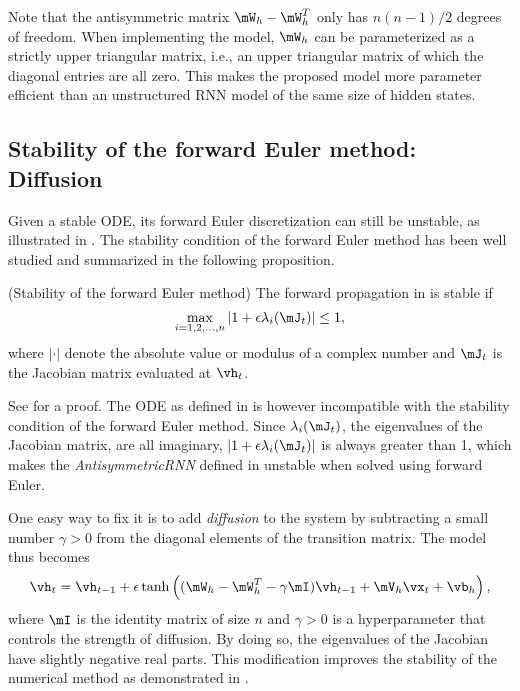 Note that the antisymmetric matrix $\mW_h - \mW_h^T$ only has $n(n-1)/2$ degrees of freedom.
When implementing the model, 
$\mW_h$ can be parameterized as a strictly upper triangular matrix, 
i.e., an upper triangular matrix of which the diagonal entries are all zero.
This makes the proposed model more parameter efficient than an unstructured RNN model of the same size of hidden states.


\subsection{Stability of the forward Euler method: Diffusion}

Given a stable ODE, its forward Euler discretization can still be unstable, as illustrated in .
The stability condition of the forward Euler method has been well studied and summarized in the following proposition.
\begin{proposition}
\label{prop:forward_Euler_stability}
(Stability of the forward Euler method) 
The forward propagation in  is stable if
\begin{equation}
    \max_{i=1, 2, \ldots, n}
    |1 + \epsilon \lambda_i (\mJ_{t})| \leq 1,
\end{equation}
where $|\cdot|$ denote the absolute value or modulus of a complex number and $\mJ_{t}$ is the Jacobian matrix evaluated at $\vh_t$.
\end{proposition}
See \cite{ascher1998computer} for a proof.
The ODE as defined in  is however incompatible with the stability condition of the forward Euler method.
Since $\lambda_i (\mJ_{t})$, the eigenvalues of the Jacobian matrix, are all imaginary, $|1 + \epsilon \lambda_i (\mJ_{t})|$ is always greater than 1, which makes the \textit{AntisymmetricRNN} defined in  unstable when solved using forward Euler.


One easy way to fix it is to add \textit{diffusion} to the system by subtracting a small number $\gamma > 0$ from the diagonal elements of the transition matrix.
The model thus becomes
\begin{equation}
\label{eq:antisymm_RNN_diff}
\vh_{t}
=
\vh_{t-1}
+
\epsilon
\tanh\left((\mW_h - \mW_h^T - \gamma \mI) \vh_{t-1} + \mV_h \vx_{t} + \vb_h
\right),
\end{equation}
where $\mI$ is the identity matrix of size $n$ and $\gamma > 0$ is a hyperparameter that controls the strength of diffusion.
By doing so, the eigenvalues of the Jacobian have slightly negative real parts. 
This modification improves the stability of the numerical method as demonstrated in .





